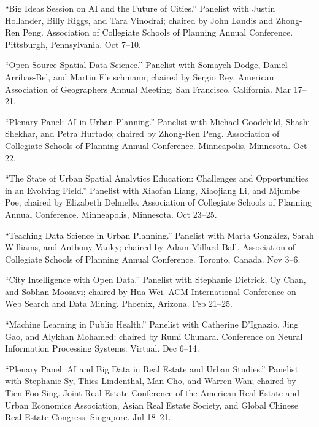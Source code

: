 \documentclass[11pt,letterpaper]{report} %
\begin{document}
\begin{tablist}

\item[2026] \tab{}\enquote{Big Ideas Session on AI and the Future of Cities.} Panelist with Justin Hollander, Billy Riggs, and Tara Vinodrai; chaired by John Landis and Zhong-Ren Peng. Association of Collegiate Schools of Planning Annual Conference. Pittsburgh, Pennsylvania. Oct 7--10.

\item[2026] \tab{}\enquote{Open Source Spatial Data Science.} Panelist with Somayeh Dodge, Daniel Arribas-Bel, and Martin Fleischmann; chaired by Sergio Rey. American Association of Geographers Annual Meeting. San Francisco, California. Mar 17--21.

\item[2025] \tab{}\enquote{Plenary Panel: AI in Urban Planning.} Panelist with Michael Goodchild, Shashi Shekhar, and Petra Hurtado; chaired by Zhong-Ren Peng. Association of Collegiate Schools of Planning Annual Conference. Minneapolis, Minnesota. Oct 22.

\item[2025] \tab{}\enquote{The State of Urban Spatial Analytics Education: Challenges and Opportunities in an Evolving Field.} Panelist with Xiaofan Liang, Xiaojiang Li, and Mjumbe Poe; chaired by Elizabeth Delmelle. Association of Collegiate Schools of Planning Annual Conference. Minneapolis, Minnesota. Oct 23--25.

\item[2022] \tab{}\enquote{Teaching Data Science in Urban Planning.} Panelist with Marta Gonz{\'a}lez, Sarah Williams, and Anthony Vanky; chaired by Adam Millard-Ball. Association of Collegiate Schools of Planning Annual Conference. Toronto, Canada. Nov 3--6.

\item[2022] \tab{}\enquote{City Intelligence with Open Data.} Panelist with Stephanie Dietrick, Cy Chan, and Sobhan Moosavi; chaired by Hua Wei. ACM International Conference on Web Search and Data Mining. Phoenix, Arizona. Feb 21--25.

\item[2021] \tab{}\enquote{Machine Learning in Public Health.} Panelist with Catherine D'Ignazio, Jing Gao, and Alykhan Mohamed; chaired by Rumi Chunara. Conference on Neural Information Processing Systems. Virtual. Dec 6--14.

\item[2021] \tab{}\enquote{Plenary Panel: AI and Big Data in Real Estate and Urban Studies.} Panelist with Stephanie Sy, Thies Lindenthal, Man Cho, and Warren Wan; chaired by Tien Foo Sing. Joint Real Estate Conference of the American Real Estate and Urban Economics Association, Asian Real Estate Society, and Global Chinese Real Estate Congress. Singapore. Jul 18--21.


\end{tablist}
\end{document}
